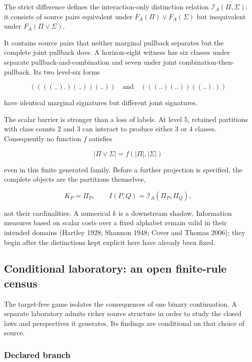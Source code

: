 \documentclass[11pt,a4paper]{article}
\begin{document}
The strict difference defines the interaction-only distinction relation
\(\mathcal{I}_{A}(\Pi,\Sigma)\): it consists of source pairs equivalent
under \(F_{A}(\Pi) \vee F_{A}(\Sigma)\) but inequivalent under
\(F_{A}(\Pi \vee \Sigma)\).

It contains source pairs that neither marginal pullback separates but
the complete joint pullback does. A horizon-eight witness has six
classes under separate pullback-and-combination and seven under joint
combination-then-pullback. Its two level-six forms

\[\left( \left( \left( (..). \right)(..) \right)(..) \right)\quad\text{and}\quad\left( \left( (..)(..) \right)\left( (..). \right) \right)\]

have identical marginal signatures but different joint signatures.

The scalar barrier is stronger than a loss of labels. At level 5,
retained partitions with class counts \(2\) and \(3\) can interact to
produce either \(3\) or \(4\) classes. Consequently no function \(f\)
satisfies

\[|\Pi \vee \Sigma| = f\left( |\Pi|,|\Sigma| \right)\]

even in this finite generated family. Before a further projection is
specified, the complete objects are the partitions themselves,

\[K_{P} = \Pi_{P},\quad\quad I(P,Q) = \mathcal{I}_{A}\left( \Pi_{P},\Pi_{Q} \right),\]

not their cardinalities. A numerical \(k\) is a downstream shadow.
Information measures based on scalar costs over a fixed alphabet remain
valid in their intended domains (Hartley 1928; Shannon 1948; Cover and
Thomas 2006); they begin after the distinctions kept explicit here have
already been fixed.

\subsection{Conditional laboratory: an open finite-rule
census}

The target-free game isolates the consequences of one binary
continuation. A separate laboratory admits richer source structure in
order to study the closed laws and perspectives it generates. Its
findings are conditional on that choice of source.

\subsubsection{Declared branch}
\end{document}
